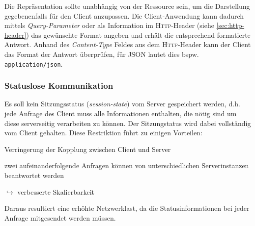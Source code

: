 Die Repräsentation sollte unabhängig von der Ressource sein, um die Darstellung gegebenenfalls für den Client anzupassen. 
Die Client-Anwendung kann dadurch mittels \emph{Query-Parameter} oder als Information im \textsc{Http}-Header (siehe \cref{sec:http-header}) das gewünschte Format angeben und erhält die entsprechend formatierte Antwort.
Anhand des \emph{Content-Type} Feldes aus dem \textsc{Http}-Header kann der Client das Format der Antwort überprüfen, für \gls{JSON} lautet dies bspw. \texttt{application/json}.

\subsubsection{Statuslose Kommunikation}
\label{sec:stateless_communication}

Es soll kein Sitzungsstatus (\emph{session-state}) vom Server gespeichert werden, d.h. jede Anfrage des Client muss alle Informationen enthalten, die nötig sind um diese serverseitig verarbeiten zu können. Der Sitzungstatus wird dabei vollständig vom Client gehalten. 
Diese Restriktion führt zu einigen Vorteilen:
\begin{compactitem}
    \item Verringerung der Kopplung zwischen Client und Server
    \item zwei aufeinanderfolgende Anfragen können von unterschiedlichen Serverinstanzen beantwortet werden
    \item[$\hookrightarrow$] verbesserte Skalierbarkeit
\end{compactitem}

Daraus resultiert eine erhöhte Netzwerklast, da die Statusinformationen bei jeder Anfrage mitgesendet werden müssen.
